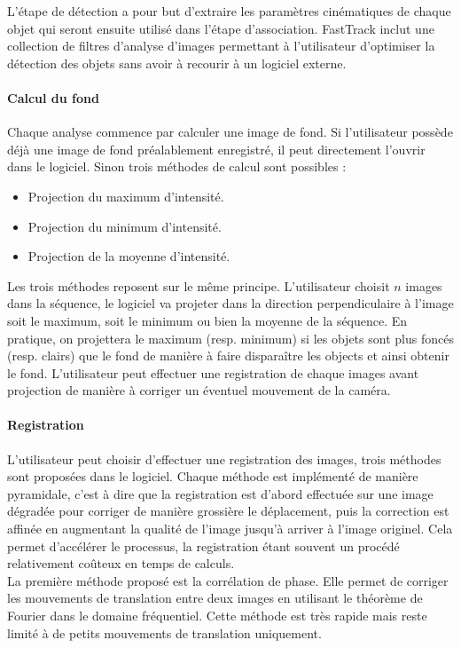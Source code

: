 		L'étape de détection a pour but d'extraire les paramètres cinématiques de chaque objet qui seront ensuite utilisé dans l'étape d'association. FastTrack inclut une collection de filtres d'analyse d'images permettant à l'utilisateur d'optimiser la détection des objets sans avoir à recourir à un logiciel externe.
		
		
		\paragraph{Calcul du fond}
		Chaque analyse commence par calculer une image de fond. Si l'utilisateur possède déjà une image de fond préalablement enregistré, il peut directement l'ouvrir dans le logiciel. Sinon trois méthodes de calcul sont possibles :
		\begin{itemize}
			\item Projection du maximum d'intensité.
			\item Projection du minimum d'intensité.
			\item Projection de la moyenne d'intensité.		
		\end{itemize}
		Les trois méthodes reposent sur le même principe. L'utilisateur choisit $n$ images dans la séquence, le logiciel va projeter dans la direction perpendiculaire à l'image soit le maximum, soit le minimum ou bien la moyenne de la séquence. En pratique, on projettera le maximum (resp. minimum) si les objets sont plus foncés (resp. clairs) que le fond de manière à faire disparaître les objects et ainsi obtenir le fond. L'utilisateur peut effectuer une registration de chaque images avant projection de manière à corriger un éventuel mouvement de la caméra.
		
		
		\paragraph{Registration}
		L'utilisateur peut choisir d'effectuer une registration des images, trois méthodes sont proposées dans le logiciel. Chaque méthode est implémenté de manière pyramidale, c'est à dire que la registration est d'abord effectuée sur une image dégradée pour corriger de manière grossière le déplacement, puis la correction est affinée en augmentant la qualité de l'image jusqu'à arriver à l'image originel. Cela permet d'accélérer le processus, la registration étant souvent un procédé relativement coûteux en temps de calculs.\\
		
		La première méthode proposé est la corrélation de phase. Elle permet de corriger les mouvements de translation entre deux images en utilisant le théorème de Fourier dans le domaine fréquentiel. Cette méthode est très rapide mais reste limité à de petits mouvements de translation uniquement.\\
		
